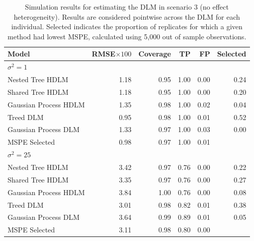 \documentclass[12pt]{article}
\begin{document}
\begin{table}[!ht]
 \scriptsize
    \centering
    \caption{Simulation results for estimating the DLM in scenario 3 (no effect heterogeneity). Results are considered pointwise across the DLM for each individual. Selected indicates the proportion of replicates for which a given method had lowest MSPE, calculated using 5,000 out of sample observations.}\vspace{6pt}
    \label{tab:scen3_res}
    \begin{tabular}{lrrrrr}
        \toprule[2pt]
        Model & RMSE$\times100$ & Coverage & TP & FP & Selected\\
        \midrule
        \multicolumn{6}{l}{$\sigma^2=1$}\\
Nested Tree HDLM & 1.18 & 0.95 & 1.00 & 0.00 & 0.24\\
Shared Tree HDLM & 1.18 & 0.95 & 1.00 & 0.00 & 0.20\\
Gaussian Process HDLM & 1.35 & 0.98 & 1.00 & 0.02 & 0.04\\
\addlinespace
Treed DLM & 0.95 & 0.98 & 1.00 & 0.01 & 0.52\\
Gaussian Process DLM & 1.33 & 0.97 & 1.00 & 0.03 & 0.00\\
\addlinespace
MSPE Selected & 0.98 & 0.97 & 1.00 & 0.01 & \\
\midrule

        
        \multicolumn{6}{l}{$\sigma^2=25$}\\
Nested Tree HDLM & 3.42 & 0.97 & 0.76 & 0.00 & 0.22\\
Shared Tree HDLM & 3.35 & 0.97 & 0.76 & 0.00 & 0.27\\
Gaussian Process HDLM & 3.84 & 1.00 & 0.76 & 0.00 & 0.08\\
\addlinespace
Treed DLM & 3.01 & 0.98 & 0.82 & 0.01 & 0.38\\
Gaussian Process DLM & 3.64 & 0.99 & 0.89 & 0.01 & 0.05\\
\addlinespace
MSPE Selected & 3.11 & 0.98 & 0.80 & 0.00 & \\
        \bottomrule[2pt]
    \end{tabular}
\end{table}
\end{document}
